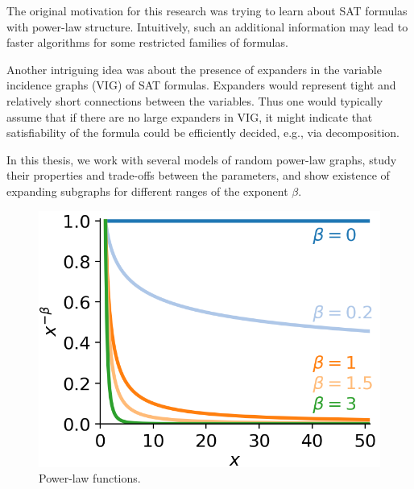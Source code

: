 The original motivation for this research was trying to learn
about SAT formulas with power-law structure.
Intuitively, such an additional information may lead
to faster algorithms for some restricted families of formulas.

Another intriguing idea was about the presence of expanders
in the variable incidence graphs (VIG) of SAT formulas.
Expanders would represent tight and relatively short connections
between the variables. Thus one would typically assume that if there are
no large expanders in VIG, it might indicate that satisfiability
of the formula could be efficiently decided, e.g., via decomposition.

In this thesis, we work with several models of random power-law graphs,
study their properties and trade-offs between the parameters,
and show existence of expanding subgraphs for different ranges of the exponent $\beta$.

\begin{figure}
    \centering
    \includegraphics[scale=0.75]{images/generated/power-law}
    \caption{Power-law functions.}
    \label{fig:power-law-functions}
\end{figure}

